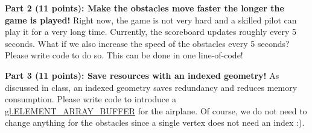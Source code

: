 \documentclass[10pt,oneside,onecolumn,letterpaper]{article}
\begin{document}
\vspace{1cm}

\noindent \textbf{Part 2 (11 points): Make the obstacles move faster the longer the game is played!} Right now, the game is not very hard and a skilled pilot can play it for a very long time. Currently, the scoreboard updates roughly every 5 seconds. What if we also increase the speed of the obstacles every 5 seconds? Please write code to do so. This can be done in one line-of-code!

\vspace{1cm}

\noindent \textbf{Part 3 (11 points): Save resources with an indexed geometry!} As discussed in class, an indexed geometry saves redundancy and reduces memory consumption. Please write code to introduce a \url{gl.ELEMENT_ARRAY_BUFFER} for the airplane. Of course, we do not need to change anything for the obstacles since a single vertex does not need an index :).
\end{document}
